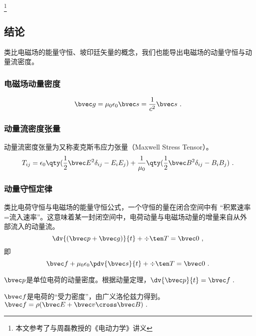 
\footnote{本文参考了\cite{GriffE}与周磊教授的《电动力学》讲义}
\subsection{结论}
类比电磁场的能量守恒、坡印廷矢量的概念，我们也能导出电磁场的动量守恒与动量流密度。

\subsubsection{电磁场动量密度}
\begin{equation}
\bvec g = \mu_0 \epsilon_0 \bvec s = \frac{1}{c^2} \bvec s ~.
\end{equation}

\subsubsection{动量流密度张量}
动量流密度张量为又称麦克斯韦应力张量（Maxwell Stress Tensor）。
\begin{equation}\label{eq_EBP_2}
T_{ij} = \epsilon_0 \qty(\frac12 \bvec E^2 \delta_{ij} - E_i E_j) + \frac{1}{\mu_0} \qty(\frac12 \bvec B^2 \delta_{ij} - B_i B_j)~.
\end{equation} 

\subsubsection{动量守恒定律}
类比电荷守恒与电磁场的能量守恒公式，一个守恒的量在闭合空间中有 “积累速率=流入速率”。这意味着某一封闭空间中，电荷动量与电磁场动量的增量来自从外部流入的动量流。
\begin{equation}
\dv{(\bvec p + \bvec g)}{t} + \div \ten T = \bvec 0~,
\end{equation}
即
\begin{equation}\label{eq_EBP_1}
\bvec f  + \mu_0 \epsilon_0 \pdv{\bvec s}{t} + \div \ten T= \bvec 0~.
\end{equation} 

$\bvec p$是单位电荷的动量密度。根据动量定理，$\dv{\bvec p}{t} = \bvec f~.$

$\bvec f$是电荷的“受力密度”，由广义洛伦兹力得到。$\bvec f = \rho (\bvec E + \bvec v \cross \bvec B)~.$

